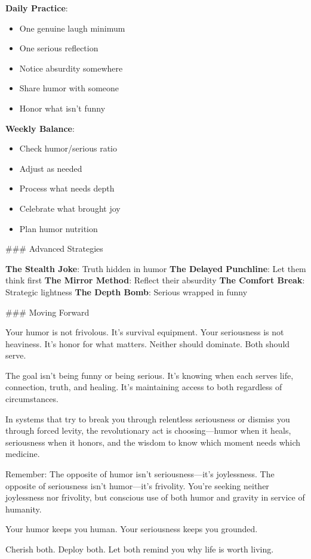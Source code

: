 \documentclass[12pt]{book}
\begin{document}
\textbf{Daily Practice}:
\begin{itemize}
\item One genuine laugh minimum
\item One serious reflection
\item Notice absurdity somewhere
\item Share humor with someone
\item Honor what isn't funny

\end{itemize}
\textbf{Weekly Balance}:
\begin{itemize}
\item Check humor/serious ratio
\item Adjust as needed
\item Process what needs depth
\item Celebrate what brought joy
\item Plan humor nutrition

\end{itemize}
\#\#\# Advanced Strategies

\textbf{The Stealth Joke}: Truth hidden in humor
\textbf{The Delayed Punchline}: Let them think first
\textbf{The Mirror Method}: Reflect their absurdity
\textbf{The Comfort Break}: Strategic lightness
\textbf{The Depth Bomb}: Serious wrapped in funny

\#\#\# Moving Forward

Your humor is not frivolous. It's survival equipment. Your seriousness is not heaviness. It's honor for what matters. Neither should dominate. Both should serve.

The goal isn't being funny or being serious. It's knowing when each serves life, connection, truth, and healing. It's maintaining access to both regardless of circumstances.

In systems that try to break you through relentless seriousness or dismiss you through forced levity, the revolutionary act is choosing—humor when it heals, seriousness when it honors, and the wisdom to know which moment needs which medicine.

Remember: The opposite of humor isn't seriousness—it's joylessness. The opposite of seriousness isn't humor—it's frivolity. You're seeking neither joylessness nor frivolity, but conscious use of both humor and gravity in service of humanity.

Your humor keeps you human. Your seriousness keeps you grounded.

Cherish both. Deploy both. Let both remind you why life is worth living.
\end{document}

